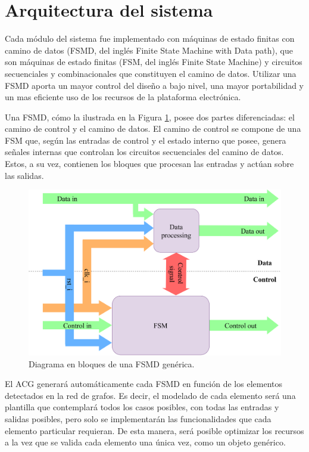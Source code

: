 \section{Arquitectura del sistema}
	\label{sec:interlockingArch}
	
	Cada módulo del sistema fue implementado con máquinas de estado finitas	con camino de datos (FSMD, del inglés Finite State Machine with Data path), que son máquinas de estado finitas (FSM, del inglés Finite State Machine) y circuitos
	secuenciales y combinacionales que constituyen el camino de datos. Utilizar una FSMD aporta un mayor control del diseño a bajo nivel, una mayor portabilidad y un mas eficiente uso de los recursos de la plataforma electrónica.
	
	Una FSMD, cómo la ilustrada en la Figura \ref{fig:FSMD}, posee dos partes diferenciadas: el camino de control y el camino de datos. El camino de control se compone de una FSM que, según las entradas de control y el estado interno que posee, genera señales internas que controlan los circuitos secuenciales del camino de datos. Estos, a su vez, contienen los bloques que procesan las entradas y actúan sobre las salidas.
	
	\begin{figure}[H]
		\centering
		\includegraphics[width=1\textwidth]{Figuras/FSMD.png}
		\centering\caption{Diagrama en bloques  de una FSMD genérica.}
		\label{fig:FSMD}
	\end{figure}
	
	El ACG generará automáticamente cada FSMD en función de los elementos detectados en la red de grafos. Es decir, el modelado de cada elemento será una plantilla que contemplará todos los casos posibles, con todas las entradas y salidas posibles, pero solo se implementarán las funcionalidades que cada elemento particular requieran. De esta manera, será posible optimizar los recursos a la vez que se valida cada elemento una única vez, como un objeto genérico.
	
